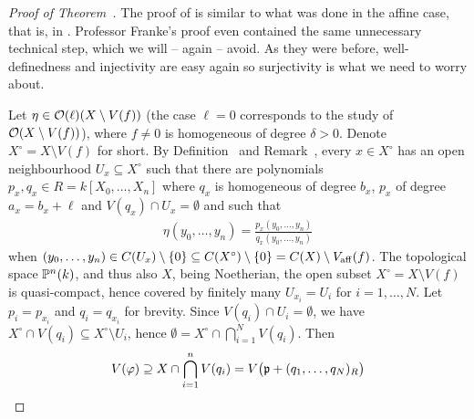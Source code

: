 \documentclass[a4paper,parskip=half,numbers=enddot, DIV=12]{scrreprt}
\begin{document}
\begin{proof}[Proof of Theorem~]
    The proof of  is similar to what was done in the affine case, that is, in \cite[Proposition~2.2.2]{alg1}. Professor Franke's proof even contained the same unnecessary technical step, which we will -- again -- avoid. As they were before, well-definedness and injectivity are easy again so surjectivity is what we need to worry about. 
    
    Let $\eta\in \mathcal{O}(\ell)(X\setminus V(f))$ (the case $\ell=0$ corresponds to the study of $\mathcal{O}(X\setminus V(f))$), where $f\neq 0$ is homogeneous of degree $\delta >0$. Denote $X^\circ=X\setminus V(f)$ for short. By Definition~ and Remark~, every $x\in X^\circ$ has an open neighbourhood $U_x\subseteq X^\circ$ such that there are polynomials $p_x,q_x\in R=k[X_0,\ldots, X_n]$ where $q_x$ is homogeneous of degree $b_x$, $p_x$ of degree $a_x = b_x+\ell$ and $V(q_x)\cap U_x = \emptyset$ and such that 
    \begin{align*}
        \eta(y_0,\ldots, y_n) = \frac{p_x(y_0,\ldots, y_n)}{q_x(y_0,\ldots, y_n)}
    \end{align*}
    when $(y_0,\ldots, y_n)\in C(U_x)\setminus\{0\}\subseteq C(X^\circ)\setminus \{0\}=C(X)\setminus V_{\mathrm{aff}}(f)$. The topological space $\mathbb{P}^n(k)$, and thus also $X$, being Noetherian, the open subset $X^\circ=X\setminus V(f)$ is quasi-compact, hence covered by finitely many $U_{x_i}=U_i$ for $i=1,\ldots, N$. Let $p_i=p_{x_i}$ and $q_i=q_{x_i}$ for brevity. Since $V(q_i)\cap U_i=\emptyset$, we have $X^\circ\cap V(q_i)\subseteq X^\circ\setminus U_i$, hence $\emptyset=X^\circ\cap\bigcap_{i=1}^NV(q_i)$.
    Then 
    \begin{align*}
        V(\phi) \supseteq X\cap \bigcap_{i=1}^n V(q_i) = V\big(\pp+ (q_1,\ldots, q_N)_R\big)

\end{align*}
\end{proof}
\end{document}
